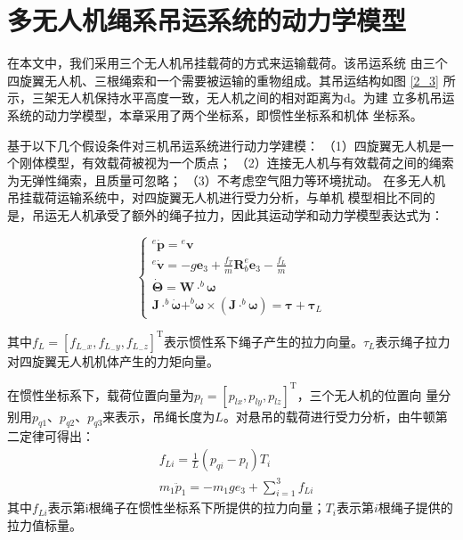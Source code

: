 \documentclass[lang=chs, degree=master, blindreview=false, winfonts=true]{yanputhesis}
\begin{document}
\section{多无人机绳系吊运系统的动力学模型}
在本文中，我们采用三个无人机吊挂载荷的方式来运输载荷。该吊运系统
由三个四旋翼无人机、三根绳索和一个需要被运输的重物组成。其吊运结构如图 \ref{2_3} 所示，三架无人机保持水平高度一致，无人机之间的相对距离为d。为建
立多机吊运系统的动力学模型，本章采用了两个坐标系，即惯性坐标系和机体
坐标系。


基于以下几个假设条件对三机吊运系统进行动力学建模：
（1）四旋翼无人机是一个刚体模型，有效载荷被视为一个质点；
（2）连接无人机与有效载荷之间的绳索为无弹性绳索，且质量可忽略；
（3）不考虑空气阻力等环境扰动。
在多无人机吊挂载荷运输系统中，对四旋翼无人机进行受力分析，与单机
模型相比不同的是，吊运无人机承受了额外的绳子拉力，因此其运动学和动力学模型表达式为：

\begin{equation}
	\begin{cases}{}^{e}\dot{\boldsymbol{p}}={}^{e}\boldsymbol{v}\\{}^{e}\dot{\boldsymbol{v}}=-g\boldsymbol{e}_{3}+\frac{f_{T}}{m}\boldsymbol{R}_{b}^{e}\boldsymbol{e}_{3}-\frac{f_{L}}{m}\\\dot{\boldsymbol{\Theta}}=\boldsymbol{W}\cdot^{b}\boldsymbol{\omega}\\\boldsymbol{J}\cdot^{b}\dot{\boldsymbol{\omega}}+^{b}\boldsymbol{\omega}\times(\boldsymbol{J}\cdot^{b}\boldsymbol{\omega})=\boldsymbol{\tau}+\boldsymbol{\tau}_{L}\end{cases}
\end{equation}

其中$f_{L}=[f_{L_{-}x},f_{L_{-}y},f_{L_{-}z}]^{\mathrm{T}}$表示惯性系下绳子产生的拉力向量。$\tau_{L}$表示绳子拉力对四旋翼无人机机体产生的力矩向量。

在惯性坐标系下，载荷位置向量为$p_{l}=[p_{lx},p_{ly},p_{lz}]^{\mathrm{T}}$，三个无人机的位置向
量分别用$p_{q1}$、$p_{q2}$、$p_{q3}$来表示，吊绳长度为$L$。对悬吊的载荷进行受力分析，由牛顿第二定律可得出：
\begin{equation}
	\begin{aligned}
		&f_{Li}=\frac{1}{L}(p_{qi}-p_{l})T_{i} \\
		&m_{1}\ddot{p}_{1}=-m_{1}ge_{3}+\sum_{i=1}^{3}f_{Li}
	\end{aligned}
\end{equation}
其中$f_{Li}$表示第i根绳子在惯性坐标系下所提供的拉力向量；$T_{i}$表示第$i$根绳子提供的拉力值标量。
\end{document}
